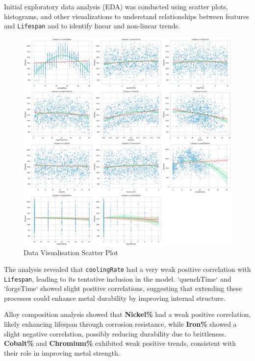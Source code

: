 \documentclass{article}
\begin{document}
Initial exploratory data analysis (EDA) was conducted using scatter plots, histograms, and other visualizations to understand relationships between features and \texttt{Lifespan} and to identify linear and non-linear trends.

\begin{figure}[htbp]
    \centering
    \includegraphics[width=1\textwidth]{./Images/DataVisualisationScatterPlot.png}
    \caption{Data Visualisation Scatter Plot}
    \label{fig:data_visualisation_scatter_plot}
\end{figure}

The analysis revealed that \texttt{coolingRate} had a very weak positive correlation with \texttt{Lifespan}, leading to its tentative inclusion in the model. `quenchTime` and `forgeTime` showed slight positive correlations, suggesting that extending these processes could enhance metal durability by improving internal structure.

Alloy composition analysis showed that \textbf{Nickel\%} had a weak positive correlation, likely enhancing lifespan through corrosion resistance, while \textbf{Iron\%} showed a slight negative correlation, possibly reducing durability due to brittleness. \textbf{Cobalt\%} and \textbf{Chromium\%} exhibited weak positive trends, consistent with their role in improving metal strength.
\end{document}
